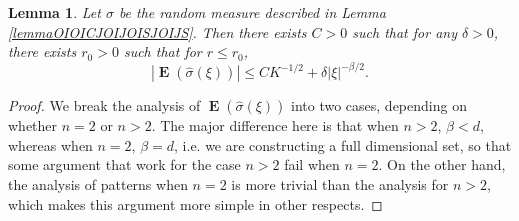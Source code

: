 \documentclass[12pt,reqno]{article}
\numberwithin{equation}{section}
\DeclareMathOperator{\TT}{\mathbf{T}}
\newtheorem{lemma}[theorem]{Lemma}
\numberwithin{theorem}{section}
\DeclareMathOperator{\EE}{\mathbf{E}}
\DeclareMathOperator{\PP}{\mathbf{P}}
\begin{document}
\begin{lemma} \label{lemmaOIJIOCJSOIJSIOJ123}
    Let $\sigma$ be the random measure described in Lemma \ref{lemmaOIOICJOIJOISJOIJS}. Then there exists $C > 0$ such that for any $\delta > 0$, there exists $r_0 > 0$ such that for $r \leq r_0$,
    \[ |\EE(\widehat{\sigma}(\xi))| \leq CK^{-1/2} + \delta |\xi|^{-\beta/2}. \]
\end{lemma}
\begin{proof}
    We break the analysis of $\EE(\widehat{\sigma}(\xi))$ into two cases, depending on whether $n = 2$ or $n > 2$. The major difference here is that when $n > 2$, $\beta < d$, whereas when $n = 2$, $\beta = d$, i.e.  we are constructing a full dimensional set,  so that some argument that work for the case $n > 2$ fail when $n = 2$. On the other hand, the analysis of patterns when $n = 2$ is more trivial than the analysis for $n > 2$, which makes this argument more simple in other respects.
%
%
%
%


\end{proof}
\end{document}
